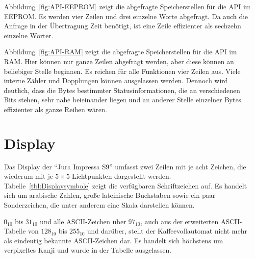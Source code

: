 Abbildung~\ref{fig:API-EEPROM} zeigt die abgefragte Speicherstellen für die \ac{API} im \ac{EEPROM}.
Es werden vier Zeilen und drei einzelne Worte abgefragt.
Da auch die Anfrage in der Übertragung Zeit benötigt, ist eine Zeile effizienter als sechzehn einzelne Wörter.

Abbildung~\ref{fig:API-RAM} zeigt die abgefragte Speicherstellen für die \ac{API} im \ac{RAM}.
Hier können nur ganze Zeilen abgefragt werden, aber diese können an beliebiger Stelle beginnen.
Es reichen für alle Funktionen vier Zeilen aus.
Viele interne Zähler und Dopplungen können ausgelassen werden.
Dennoch wird deutlich, dass die Bytes bestimmter Statusinformationen, die an verschiedenen Bits stehen, sehr nahe beieinander liegen und an anderer Stelle einzelner Bytes effizienter als ganze Reihen wären.

\section{Display}\label{sec:Display}
Das Display der "`Jura Impressa S9"' umfasst zwei Zeilen mit je acht Zeichen, die wiederum mit je $5 \times 5$ Lichtpunkten dargestellt werden.
Tabelle~\ref{tbl:Displaysymbole} zeigt die verfügbaren Schriftzeichen auf.
Es handelt sich um arabische Zahlen, große lateinische Buchstaben sowie ein paar Sonderzeichen, die unter anderem eine Skala darstellen können.

$0_{10}$ bis $31_{10}$ und alle \ac{ASCII}-Zeichen über $97_{10}$, auch aus der erweiterten \ac{ASCII}-Tabelle von $128_{10}$ bis $255_{10}$ und darüber, stellt der Kaffeevollautomat nicht mehr als eindeutig bekannte \ac{ASCII}-Zeichen dar.
Es handelt sich höchstens um verpixeltes Kanji und wurde in der Tabelle ausgelassen.
